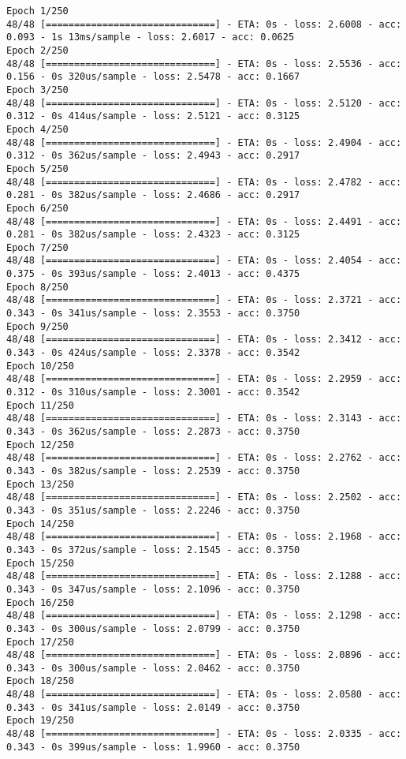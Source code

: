 \documentclass[11pt]{article}
\begin{document}
    \begin{Verbatim}[commandchars=\\\{\}]
Epoch 1/250
48/48 [==============================] - ETA: 0s - loss: 2.6008 - acc: 0.093 - 1s 13ms/sample - loss: 2.6017 - acc: 0.0625
Epoch 2/250
48/48 [==============================] - ETA: 0s - loss: 2.5536 - acc: 0.156 - 0s 320us/sample - loss: 2.5478 - acc: 0.1667
Epoch 3/250
48/48 [==============================] - ETA: 0s - loss: 2.5120 - acc: 0.312 - 0s 414us/sample - loss: 2.5121 - acc: 0.3125
Epoch 4/250
48/48 [==============================] - ETA: 0s - loss: 2.4904 - acc: 0.312 - 0s 362us/sample - loss: 2.4943 - acc: 0.2917
Epoch 5/250
48/48 [==============================] - ETA: 0s - loss: 2.4782 - acc: 0.281 - 0s 382us/sample - loss: 2.4686 - acc: 0.2917
Epoch 6/250
48/48 [==============================] - ETA: 0s - loss: 2.4491 - acc: 0.281 - 0s 382us/sample - loss: 2.4323 - acc: 0.3125
Epoch 7/250
48/48 [==============================] - ETA: 0s - loss: 2.4054 - acc: 0.375 - 0s 393us/sample - loss: 2.4013 - acc: 0.4375
Epoch 8/250
48/48 [==============================] - ETA: 0s - loss: 2.3721 - acc: 0.343 - 0s 341us/sample - loss: 2.3553 - acc: 0.3750
Epoch 9/250
48/48 [==============================] - ETA: 0s - loss: 2.3412 - acc: 0.343 - 0s 424us/sample - loss: 2.3378 - acc: 0.3542
Epoch 10/250
48/48 [==============================] - ETA: 0s - loss: 2.2959 - acc: 0.312 - 0s 310us/sample - loss: 2.3001 - acc: 0.3542
Epoch 11/250
48/48 [==============================] - ETA: 0s - loss: 2.3143 - acc: 0.343 - 0s 362us/sample - loss: 2.2873 - acc: 0.3750
Epoch 12/250
48/48 [==============================] - ETA: 0s - loss: 2.2762 - acc: 0.343 - 0s 382us/sample - loss: 2.2539 - acc: 0.3750
Epoch 13/250
48/48 [==============================] - ETA: 0s - loss: 2.2502 - acc: 0.343 - 0s 351us/sample - loss: 2.2246 - acc: 0.3750
Epoch 14/250
48/48 [==============================] - ETA: 0s - loss: 2.1968 - acc: 0.343 - 0s 372us/sample - loss: 2.1545 - acc: 0.3750
Epoch 15/250
48/48 [==============================] - ETA: 0s - loss: 2.1288 - acc: 0.343 - 0s 347us/sample - loss: 2.1096 - acc: 0.3750
Epoch 16/250
48/48 [==============================] - ETA: 0s - loss: 2.1298 - acc: 0.343 - 0s 300us/sample - loss: 2.0799 - acc: 0.3750
Epoch 17/250
48/48 [==============================] - ETA: 0s - loss: 2.0896 - acc: 0.343 - 0s 300us/sample - loss: 2.0462 - acc: 0.3750
Epoch 18/250
48/48 [==============================] - ETA: 0s - loss: 2.0580 - acc: 0.343 - 0s 341us/sample - loss: 2.0149 - acc: 0.3750
Epoch 19/250
48/48 [==============================] - ETA: 0s - loss: 2.0335 - acc: 0.343 - 0s 399us/sample - loss: 1.9960 - acc: 0.3750

\end{Verbatim}
\end{document}
